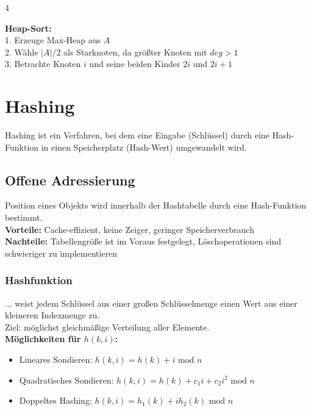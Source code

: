 \documentclass[fs, footer]{latex4ei}
\begin{document}
\begin{multicols*}{4}
{{\textbf{Heap-Sort:}\\
1. Erzeuge Max-Heap aus $A$\\
2. Wähle $|A| / 2$ als Starknoten, da größter Knoten mit $deg > 1$\\
3. Betrachte Knoten $i$ und seine beiden Kinder $2i$ und $2i+1$ \\

\section{Hashing}
Hashing ist ein Verfahren, bei dem eine Eingabe (Schlüssel) durch eine Hash-Funktion in einen Speicherplatz (Hash-Wert) umgewandelt wird.
\subsection{Offene Adressierung}
	Position eines Objekts wird innerhalb der Hashtabelle durch eine Hash-Funktion bestimmt.\\
	\textbf{Vorteile:} Cache-effizient, keine Zeiger, geringer Speicherverbrauch \\
	\textbf{Nachteile:} Tabellengröße ist im Voraus festgelegt, Löschoperationen sind schwieriger zu implementieren
\subsubsection{Hashfunktion}
	... weist jedem Schlüssel aus einer großen Schlüsselmenge einen Wert aus einer kleineren Indexmenge zu.\\
	Ziel: möglichst gleichmäßige Verteilung aller Elemente.\\
	\textbf{Möglichkeiten für $h(k,i)$:}
	\begin{itemize}
		\item Lineares Sondieren: $h(k,i)=h(k)+i\text{ mod }n$
		\item Quadratisches Sondieren: $h(k,i)=h(k)+c_1i+c_2i^2 \text{ mod } n$
		\item Doppeltes Hashing: $h(k,i)=h_1(k)+ih_2(k) \text{ mod } n$
	\end{itemize}
}}
\end{multicols*}
\end{document}

